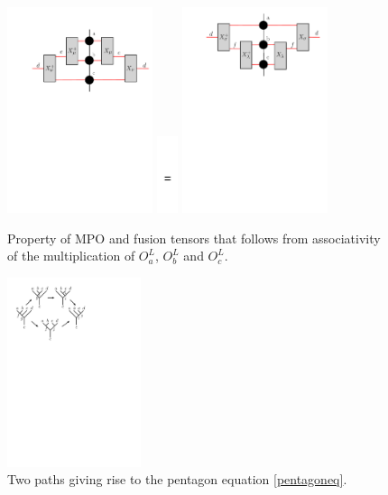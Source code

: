 \documentclass[12 pt]{article}
\begin{document}
\begin{figure}
  \centering
    \includegraphics[width=0.38\textwidth]{n11}
    \includegraphics[width=0.055\textwidth]{n10}
    \includegraphics[width=0.38\textwidth]{n12}
\caption{Property of MPO and fusion tensors that follows from associativity of the multiplication of $O^L_a$, $O^L_b$ and $O^L_c$.}
\label{associativity}
\end{figure}
\begin{figure}
  \centering
    \includegraphics[width=0.35\textwidth]{n13}
\caption{Two paths giving rise to the pentagon equation \eqref{pentagoneq}.}
\label{pentagon}
\end{figure}
\end{document}
